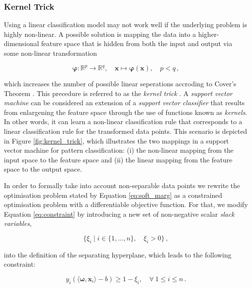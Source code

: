 \subsubsection{Kernel Trick}

Using a linear classification model may not work well if the underlying problem is highly non-linear. A possible solution is mapping the data into a higher-dimensional feature space that is hidden from both the input and output via some non-linear transformation

\begin{equation}
\bm{\varphi} \colon \mathbb{R}^{p} \to \mathbb{R}^{q}, \quad \bm{x} \mapsto \bm{\varphi}(\bm{x}), \quad p < q \,,
\end{equation}

\noindent
which increases the number of possible linear seperations accroding to Cover's Theorem \cite{cover}. This precedure is referred to as the \emph{kernel trick} \cite{haykin2009neural}. A \emph{support vector machine} can be considered an extension of a \emph{support vector classifier} that results from enlargening the feature space through the use of functions known as \emph{kernels}. In other words, it can learn a non-linear classification rule that corresponds to a linear classification rule for the transformed data points. This scenario is depicted in Figure \ref{fig:kernel_trick}, which illustrates the two mappings in a support vector machine for pattern classification: (i) the non-linear mapping from the input space to the feature space and (ii) the linear mapping from the feature space to the output space.




In order to formally take into account non-separable data points we rewrite the optimisation problem stated by Equation \ref{eq:soft_marg} as a constrained optimisation problem with a differentiable objective function. For that, we modify Equation \ref{eq:constraint} by introducing a new set of non-negative scalar \emph{slack variables},

 \begin{equation}
\{\xi_i \mid i \in \{1, \dots, n\}, \quad \xi_i > 0\}\,,
\end{equation}

\noindent
into the definition of the separating hyperplane, which leads to the following constraint:

\begin{equation}
y_i (\langle \bm{\omega} , \bm{x}_i \rangle - b) \geq 1 - \xi_i, \quad \forall \ 1 \leq i \leq n\,.
\label{eq:constraint_slack}
\end{equation}


